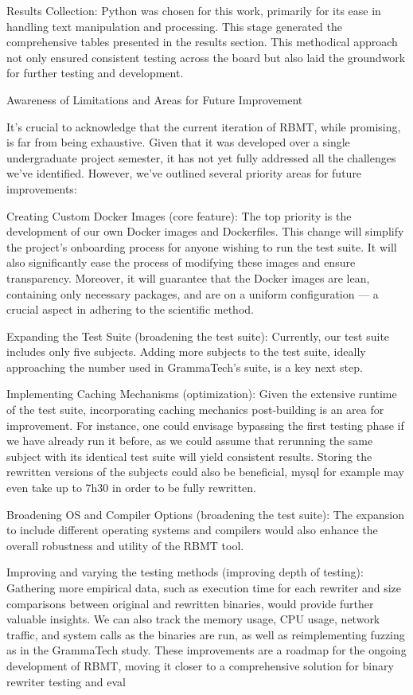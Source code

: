 \documentclass[a4paper,11pt,oneside]{report}
\begin{document}
Results Collection: Python was chosen for this work, primarily for its ease in handling
text manipulation and processing. This stage generated the comprehensive tables presented
in the results section.
This methodical approach not only ensured consistent testing across the board but
also laid the groundwork for further testing and development.

Awareness of Limitations and Areas for Future Improvement

It's crucial to acknowledge that the current iteration of RBMT, while promising, is far
from being exhaustive. Given that it was developed over a single undergraduate project
semester, it has not yet fully addressed all the challenges we've identified. However, we've
outlined several priority areas for future improvements:

Creating Custom Docker Images (core feature): The top priority is the development
of our own Docker images and Dockerfiles. This change will simplify the project's
onboarding process for anyone wishing to run the test suite. It will also significantly ease the
process of modifying these images and ensure transparency. Moreover, it will guarantee
that the Docker images are lean, containing only necessary packages, and are on a uniform
configuration — a crucial aspect in adhering to the scientific method.

Expanding the Test Suite (broadening the test suite): Currently, our test suite
includes only five subjects. Adding more subjects to the test suite, ideally approaching the
number used in GrammaTech's suite, is a key next step.

Implementing Caching Mechanisms (optimization): Given the extensive runtime of
the test suite, incorporating caching mechanics post-building is an area for improvement.
For instance, one could envisage bypassing the first testing phase if we have already run it
before, as we could assume that rerunning the same subject with its identical test suite will
yield consistent results. Storing the rewritten versions of the subjects could also be
beneficial, mysql for example may even take up to 7h30 in order to be fully rewritten.

Broadening OS and Compiler Options (broadening the test suite): The expansion
to include different operating systems and compilers would also enhance the overall
robustness and utility of the RBMT tool.

Improving and varying the testing methods (improving depth of testing):
Gathering more empirical data, such as execution time for each rewriter and size
comparisons between original and rewritten binaries, would provide further valuable
insights. We can also track the memory usage, CPU usage, network traffic, and system calls
as the binaries are run, as well as reimplementing fuzzing as in the GrammaTech study.
These improvements are a roadmap for the ongoing development of RBMT, moving
it closer to a comprehensive solution for binary rewriter testing and eval
\end{document}
